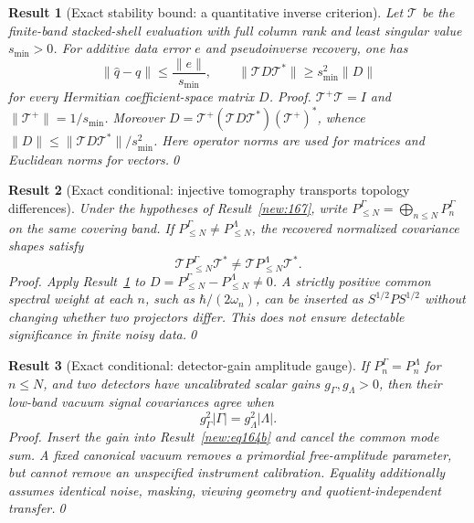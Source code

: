 \documentclass[aps,prd,onecolumn,notitlepage,groupedaddress,11pt]{revtex4-2}
\newtheorem{result}{Result}
\begin{document}
\begin{result}[\textsf{Exact stability bound}: a quantitative inverse criterion]\label{new:169}
Let $\mathcal T$ be the finite-band stacked-shell evaluation with full column rank and least singular value $s_{\min}>0$. For additive data error $e$ and pseudoinverse recovery, one has
\begin{equation}\label{new:eq169}
 \|\widehat q-q\|\le\frac{\|e\|}{s_{\min}},\qquad
 \|\mathcal T D\mathcal T^*\|\ge s_{\min}^2\|D\|
\end{equation}
for every Hermitian coefficient-space matrix $D$. \textit{Proof.} $\mathcal T^+\mathcal T=I$ and $\|\mathcal T^+\|=1/s_{\min}$. Moreover $D=\mathcal T^+(\mathcal T D\mathcal T^*)(\mathcal T^+)^*$, whence $\|D\|\le\|\mathcal T D\mathcal T^*\|/s_{\min}^2$. Here operator norms are used for matrices and Euclidean norms for vectors.\qed
\end{result}

\begin{result}[\textsf{Exact conditional}: injective tomography transports topology differences]\label{new:170}
Under the hypotheses of Result~\ref{new:167}, write $P_{\le N}^\Gamma=\bigoplus_{n\le N}P_n^\Gamma$ on the same covering band. If $P_{\le N}^\Gamma\ne P_{\le N}^\Lambda$, the recovered normalized covariance shapes satisfy
\begin{equation}\label{new:eq170}
 \mathcal T P_{\le N}^\Gamma\mathcal T^*\ne\mathcal T P_{\le N}^\Lambda\mathcal T^*.
\end{equation}
\textit{Proof.} Apply Result~\ref{new:169} to $D=P_{\le N}^\Gamma-P_{\le N}^\Lambda\ne0$. A strictly positive common spectral weight at each $n$, such as $\hbar/(2\omega_n)$, can be inserted as $S^{1/2}P S^{1/2}$ without changing whether two projectors differ. This does not ensure detectable significance in finite noisy data.\qed
\end{result}

\begin{result}[\textsf{Exact conditional}: detector-gain amplitude gauge]\label{new:171}
If $P_n^\Gamma=P_n^\Lambda$ for $n\le N$, and two detectors have uncalibrated scalar gains $g_\Gamma,g_\Lambda>0$, then their low-band vacuum signal covariances agree when
\begin{equation}\label{new:eq171}
 g_\Gamma^2|\Gamma|=g_\Lambda^2|\Lambda|.
\end{equation}
\textit{Proof.} Insert the gain into Result~\ref{new:eq164b} and cancel the common mode sum. A fixed canonical vacuum removes a \emph{primordial} free-amplitude parameter, but cannot remove an unspecified instrument calibration. Equality additionally assumes identical noise, masking, viewing geometry and quotient-independent transfer.\qed
\end{result}
\end{document}
